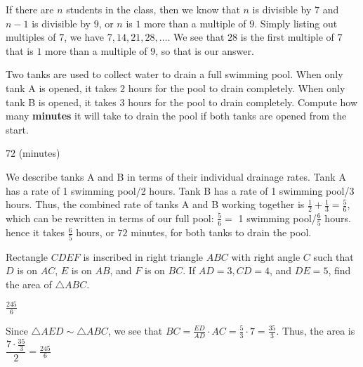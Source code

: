 \documentclass[11pt]{article}
\begin{document}
\begin{solution}
If there are $n$ students in the class, then we know that $n$ is divisible by $7$ and $n-1$ is divisible by $9$, or $n$ is $1$ more than a multiple of $9$. Simply listing out multiples of $7$, we have $7, 14, 21, 28, \ldots$. We see that $\boxed{28}$ is the first multiple of $7$ that is $1$ more than a multiple of $9$, so that is our answer.
\end{solution}


\begin{problem}%
Two tanks are used to collect water to drain a full swimming pool. When only tank A is opened, it takes $2$ hours for the pool to drain completely. When only tank B is opened, it takes $3$ hours for the pool to drain completely. Compute how many \textbf{minutes} it will take to drain the pool if both tanks are opened from the start.
\end{problem}

\begin{answer}
$\boxed{72}$ (minutes)
\end{answer}

\begin{solution}
We describe tanks A and B in terms of their individual drainage rates. Tank A has a rate of 1 swimming pool/2 hours. Tank B has a rate of 1 swimming pool/3 hours. Thus, the combined rate of tanks A and B working together is $\frac{1}{2} + \frac{1}{3} = \frac{5}{6}$, which can be rewritten in terms of our full pool: $\frac{5}{6} =$ 1 swimming pool/$\frac{6}{5}$ hours. hence it takes $\frac{6}{5}$ hours, or $\boxed{72}$ minutes, for both tanks to drain the pool.
\end{solution}


\begin{problem}%
Rectangle $CDEF$ is inscribed in right triangle $ABC$ with right angle $C$ such that $D$ is on $AC$, $E$ is on $AB$, and $F$ is on $BC$. If $AD=3, CD=4$, and $DE=5$, find the area of $\triangle ABC$.
\end{problem}

\begin{answer}
$\boxed{\frac{245}{6}}$
\end{answer}

\begin{solution}
Since $\triangle AED \sim \triangle ABC$, we see that $BC = \frac{ED}{AD} \cdot AC = \frac{5}{3} \cdot 7 = \frac{35}{3}$. Thus, the area is $\dfrac{7 \cdot \frac{35}{3}}{2} = \boxed{\frac{245}{6}}$
\end{solution}
\end{document}
